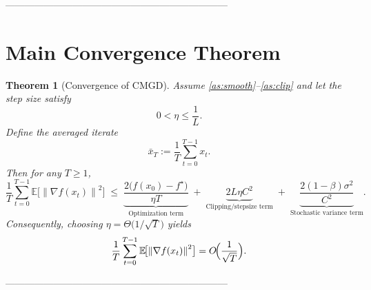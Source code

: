 \documentclass{article}
\newtheorem{theorem}{Theorem}
\newcommand{\E}{\mathbb{E}}
\newcommand{\norm}[1]{\left\lVert#1\right\rVert}
\begin{document}
---------------------------------------------------------------------

\section*{Main Convergence Theorem}
\begin{theorem}[Convergence of CMGD]\label{thm:main}
Assume \ref{as:smooth}–\ref{as:clip} and let the step size satisfy
\[
0<\eta\le \frac{1}{L}.
\]
Define the averaged iterate
\[
\bar x_{T}:=\frac{1}{T}\sum_{t=0}^{T-1}x_{t}.
\]
Then for any $T\ge 1$,
\[
\frac{1}{T}\sum_{t=0}^{T-1}\E\!\bigl[\norm{\nabla f(x_{t})}^{2}\bigr]
\;\le\;
\underbrace{\frac{2\bigl(f(x_{0})-f^{\star}\bigr)}{\eta T}}_{\text{Optimization term}}
\;+\;
\underbrace{2L\eta C^{2}}_{\text{Clipping/stepsize term}}
\;+\;
\underbrace{\frac{2(1-\beta)\sigma^{2}}{C^{2}}}_{\text{Stochastic variance term}} .
\]
Consequently, choosing $\eta=\Theta\bigl(1/\sqrt{T}\bigr)$ yields
\[
\frac{1}{T}\sum_{t=0}^{T-1}\E\!\bigl[\norm{\nabla f(x_{t})}^{2}\bigr]=O\!\Bigl(\frac{1}{\sqrt{T}}\Bigr).
\]
\end{theorem}

---------------------------------------------------------------------
\end{document}
